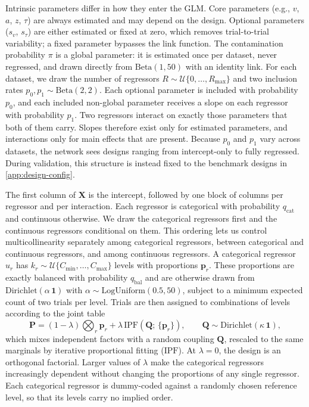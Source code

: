 \documentclass[11pt]{article}
\newcommand{\rmX}{\mathbf{X}}
\providecommand{\autoref}[1]{\ref{#1}}
\begin{document}
Intrinsic parameters differ in how they enter the GLM. Core parameters (e.g., $v$, $a$, $z$, $\tau$) are always estimated and may depend on the design. Optional parameters ($s_v$, $s_\tau$) are either estimated or fixed at zero, which removes trial-to-trial variability; a fixed parameter bypasses the link function. The contamination probability $\pi$ is a global parameter: it is estimated once per dataset, never regressed, and drawn directly from $\mathrm{Beta}(1, 50)$ with an identity link. For each dataset, we draw the number of regressors $R \sim \mathcal{U}\{0, \dots, R_{\max}\}$ and two inclusion rates $p_0, p_1 \sim \mathrm{Beta}(2, 2)$. Each optional parameter is included with probability $p_0$, and each included non-global parameter receives a slope on each regressor with probability $p_1$. Two regressors interact on exactly those parameters that both of them carry. Slopes therefore exist only for estimated parameters, and interactions only for main effects that are present. Because $p_0$ and $p_1$ vary across datasets, the network sees designs ranging from intercept-only to fully regressed. During validation, this structure is instead fixed to the benchmark designs in \autoref{app:design-config}.

The first column of $\rmX$ is the intercept, followed by one block of columns per regressor and per interaction. Each regressor is categorical with probability $q_{\mathrm{cat}}$ and continuous otherwise. We draw the categorical regressors first and the continuous regressors conditional on them. This ordering lets us control multicollinearity separately among categorical regressors, between categorical and continuous regressors, and among continuous regressors. A categorical regressor $u_r$ has $k_r \sim \mathcal{U}\{C_{\min}, \dots, C_{\max}\}$ levels with proportions $\bm{p}_r$. These proportions are exactly balanced with probability $q_{\mathrm{bal}}$ and are otherwise drawn from $\mathrm{Dirichlet}(\alpha\,\bm{1})$ with $\alpha \sim \mathrm{LogUniform}(0.5, 50)$, subject to a minimum expected count of two trials per level. Trials are then assigned to combinations of levels according to the joint table
\begin{equation}
\label{eq:joint-category-table}
  \bm{P} = (1 - \lambda) \bigotimes_{r} \bm{p}_r
         + \lambda\, \mathrm{IPF}\!\left(\bm{Q};\, \{\bm{p}_r\}\right),
  \qquad
  \bm{Q} \sim \mathrm{Dirichlet}(\kappa\,\bm{1}),
\end{equation}
which mixes independent factors with a random coupling $\bm{Q}$, rescaled to the same marginals by iterative proportional fitting ($\mathrm{IPF}$). At $\lambda = 0$, the design is an orthogonal factorial. Larger values of $\lambda$ make the categorical regressors increasingly dependent without changing the proportions of any single regressor. Each categorical regressor is dummy-coded against a randomly chosen reference level, so that its levels carry no implied order.
\end{document}
